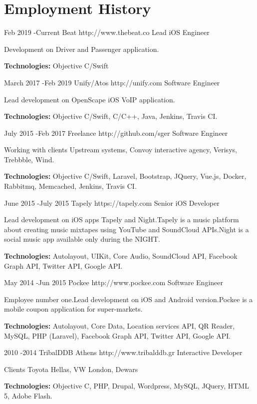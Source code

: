 \documentclass[10pt]{article}
\begin{document}
\section{Employment History}

\job
{Feb 2019 -}{Current}
{Beat}
{http://www.thebeat.co}
{Lead iOS Engineer}
{Development on Driver and Passenger application.
\\
\rule{0mm}{5mm}\textbf{Technologies:} Objective C/Swift}

\job
{March 2017 -}{Feb 2019}
{Unify/Atos}
{http://unify.com}
{Software Engineer}
{Lead development on OpenScape iOS VoIP application.
\\
\rule{0mm}{5mm}\textbf{Technologies:} Objective C/Swift, C/C++, Java, Jenkins, Travis CI.}

\job
{July 2015 -}{Feb 2017}
{Freelance}
{http://github.com/sger}
{Software Engineer}
{Working with clients Upstream systems, Convoy interactive agency, Verisys, Trebbble, Wind.
\\
\rule{0mm}{5mm}\textbf{Technologies:} Objective C/Swift, Laravel, Bootstrap, JQuery, Vue.js, Docker, Rabbitmq, Memcached, Jenkins, Travis CI.}


\job
{June 2015 -}{July 2015}
{Tapely}
{https://tapely.com}
{Senior iOS Developer}
{Lead development on iOS apps Tapely and Night.Tapely is a music platform about creating music mixtapes using YouTube and SoundCloud APIs.Night is a social music app available only during the NIGHT.
\\
\rule{0mm}{5mm}\textbf{Technologies:} Autolayout, UIKit, Core Audio, SoundCloud API, Facebook Graph API, Twitter API, Google API.}



\job
{May 2014 -}{Jun 2015}
{Pockee}
{http://www.pockee.com}
{Software Engineer}
{Employee number one.Lead development on iOS and Android version.Pockee is a mobile coupon application for super-markets.
\\
\rule{0mm}{5mm}\textbf{Technologies:} Autolayout, Core Data, Location services API, QR Reader, MySQL, PHP (Laravel), Facebook Graph API, Twitter API, Google API.}


\job
{2010 -}{2014}
{TribalDDB Athens}
{http://www.tribalddb.gr}
{Interactive Developer}
{Clients Toyota Hellas, VW London, Dewars
\\
\rule{0mm}{5mm}\textbf{Technologies:} Objective C, PHP, Drupal, Wordpress, MySQL, JQuery, HTML 5, Adobe Flash.}
\end{document}
